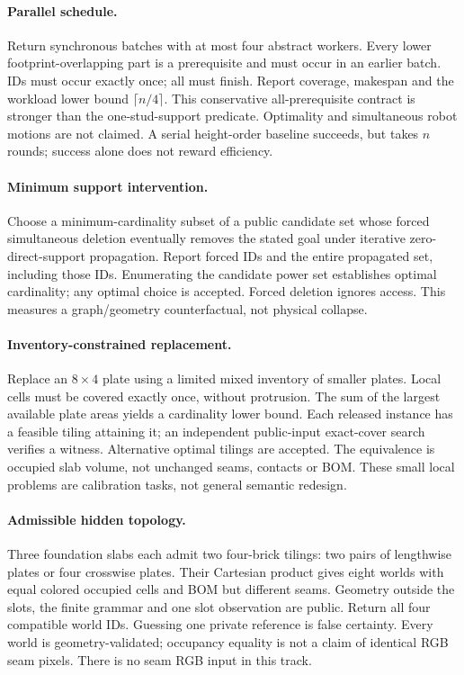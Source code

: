 \paragraph{Parallel schedule.}
Return synchronous batches with at most four abstract workers.
Every lower footprint-overlapping part is a prerequisite and must
occur in an earlier batch. IDs must occur exactly once; all must finish.
Report coverage, makespan and the workload lower bound $\lceil n/4\rceil$.
This conservative all-prerequisite contract is stronger than the
one-stud-support predicate. Optimality and simultaneous robot motions
are not claimed. A serial height-order baseline succeeds, but takes
$n$ rounds; success alone does not reward efficiency.

\paragraph{Minimum support intervention.}
Choose a minimum-cardinality subset of a public candidate set whose
forced simultaneous deletion eventually removes the stated goal under
iterative zero-direct-support propagation. Report forced IDs and the
entire propagated set, including those IDs. Enumerating the candidate
power set establishes optimal cardinality; any optimal choice is accepted.
Forced deletion ignores access. This measures a graph/geometry
counterfactual, not physical collapse.

\paragraph{Inventory-constrained replacement.}
Replace an $8\times4$ plate using a limited mixed inventory of smaller
plates. Local cells must be covered exactly once, without protrusion.
The sum of the largest available plate areas yields a cardinality
lower bound. Each released instance has a feasible tiling attaining it;
an independent public-input exact-cover search verifies a witness.
Alternative optimal tilings are accepted. The equivalence is occupied
slab volume, not unchanged seams, contacts or BOM. These small local
problems are calibration tasks, not general semantic redesign.

\paragraph{Admissible hidden topology.}
Three foundation slabs each admit two four-brick tilings: two pairs of
lengthwise plates or four crosswise plates. Their Cartesian product
gives eight worlds with equal colored occupied cells and BOM but
different seams. Geometry outside the slots, the finite grammar and
one slot observation are public. Return all four compatible world IDs.
Guessing one private reference is false certainty. Every world is
geometry-validated; occupancy equality is not a claim of identical
RGB seam pixels. There is no seam RGB input in this track.

